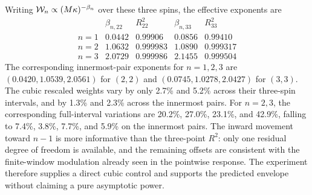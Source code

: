 \documentclass[aps,prd,twocolumn,10pt,nofootinbib,superscriptaddress,floatfix]{revtex4-2}
\begin{document}
Writing ${\cal W}_n\propto(M\kappa)^{-\beta_n}$ over these three spins, the
effective exponents are
\begin{equation}
 \begin{array}{c|cc|cc}
  & \beta_{n,22} & R^2_{22} & \beta_{n,33} & R^2_{33}\\ \hline
 n=1 & 0.0442 & 0.99906 & 0.0856 & 0.99410\\
 n=2 & 1.0632 & 0.999983 & 1.0890 & 0.999317\\
 n=3 & 2.0729 & 0.999986 & 2.1455 & 0.999504
 \end{array}
 \label{eq:bandwidth-effective-exponents}
\end{equation}
The corresponding innermost-pair exponents for $n=1,2,3$ are
$(0.0420,1.0539,2.0561)$ for $(2,2)$ and $(0.0745,1.0278,2.0427)$ for
$(3,3)$.  The cubic rescaled weights vary by only 2.7\% and 5.2\% across their
three-spin intervals, and by 1.3\% and 2.3\% across the innermost pairs.  For
$n=2,3$, the corresponding full-interval variations are 20.2\%, 27.0\%,
23.1\%, and 42.9\%, falling to 7.4\%, 3.8\%, 7.7\%, and 5.9\% on the
innermost pairs.  The inward movement toward $n-1$ is more informative than
the three-point $R^2$: only one residual degree of freedom is available, and
the remaining offsets are consistent with the finite-window modulation
already seen in the pointwise response.  The experiment therefore supplies a
direct cubic control and supports the predicted envelope without claiming a
pure asymptotic power.
\end{document}

